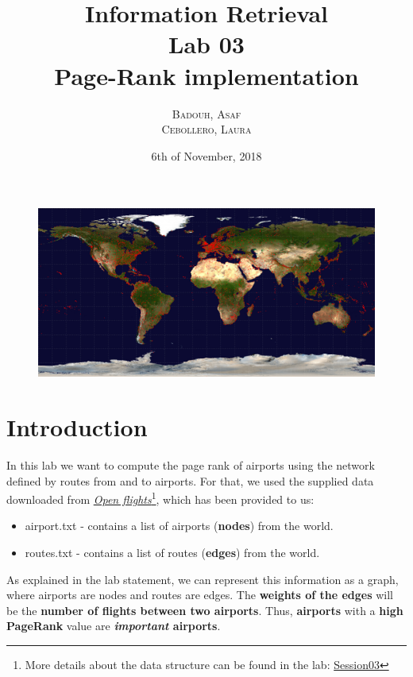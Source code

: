 \documentclass[10pt, a4paper]{article}
\title{ \Large  Information Retrieval \\ Lab 03 \\ \huge \textbf{Page-Rank implementation}}
\author{\textsc{Badouh, Asaf} \\ \textsc{Cebollero, Laura }}
\date{6th of November, 2018}
\begin{document}

\maketitle
\begin{figure}[b!]
    \centering
    \includegraphics[width=\linewidth]{openflights-apdb-2048.png}
\end{figure}


\newpage


\section{Introduction}
In this lab we want to compute the page rank of airports using the network defined by routes from and to airports. For that, we used the supplied data downloaded from  \href{https://openflights.org/data.html}{\textit{Open flights}}\footnote{More details about the data structure can be found in the lab:  \href{http://www.cs.upc.edu/~ir-miri/labs/session3.zip}{Session03}}, which has been provided to us:
\begin{itemize}
    \item {\selectfont airport.txt} - contains a list of airports (\textbf{nodes}) from the world.
    \item {\selectfont routes.txt} - contains a list of routes (\textbf{edges}) from the world.
\end{itemize}
As explained in the lab statement, we can represent this information as a graph, where airports are nodes and routes are edges. The \textbf{weights of the edges }will be the \textbf{number of flights between two airports}. Thus, \textbf{airports} with a \textbf{high PageRank} value are \textbf{\textit{important} airports}. 
\end{document}
